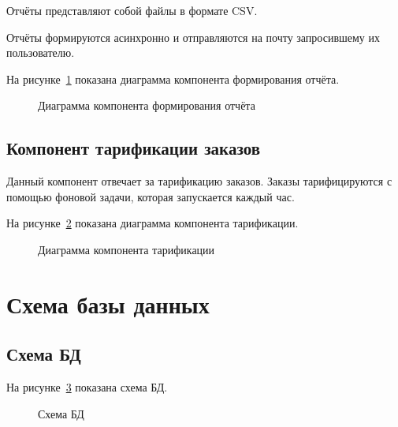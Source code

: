 Отчёты представляют собой файлы в формате CSV.

Отчёты формируются асинхронно и отправляются на почту запросившему их пользователю.

На рисунке~\ref{fig:report_scheme} показана диаграмма компонента формирования отчёта.
\begin{figure}[ht]
  \caption{Диаграмма компонента формирования отчёта}\label{fig:report_scheme}
\end{figure}

\subsection{Компонент тарификации заказов}\label{sec:subs9}
Данный компонент отвечает за тарификацию заказов. Заказы тарифицируются с помощью фоновой задачи, которая запускается каждый час.

На рисунке~\ref{fig:tarification_scheme} показана диаграмма компонента тарификации.
\begin{figure}[ht]
  \caption{Диаграмма компонента тарификации}\label{fig:tarification_scheme}
\end{figure}

\section{Схема базы данных}\label{sec:ch4/sect3}
\subsection{Схема БД}\label{sec:subs10}

На рисунке~\ref{fig:logic_scheme} показана схема БД.
\begin{figure}[ht]
  \caption{Схема БД}\label{fig:logic_scheme}
\end{figure}


